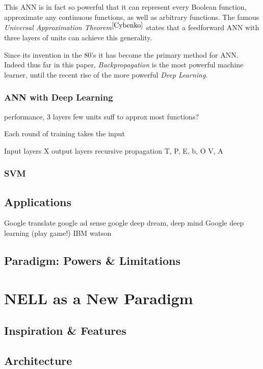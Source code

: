 \documentclass[12pt]{article}  %
\begin{document}
This ANN is in fact so powerful that it can represent every Boolean function, approximate any continuous functions, as well as arbitrary functions. The famous {\em Universal Approximation Theorem}$^{\ref{Cybenko}}$ states that a feedforward ANN with three layers of units can achieve this generality.

Since its invention in the 80's it has become the primary method for ANN. Indeed thus far in this paper, {\em Backpropagation} is the most powerful machine learner, until the recent rise of the more powerful {\em Deep Learning.}



\subsubsection{ANN with Deep Learning}







performance, 3 layers few units suff to approx most functions?

Each round of training takes the input 


Input layers X
output layers
recursive propagation
T, P, E, b, O
V, A


\subsubsection{SVM}

\subsection{Applications}
Google translate
google ad sense
google deep dream, deep mind
Google deep learning (play game!)
IBM watson


\subsection{Paradigm: Powers \& Limitations}



\section{NELL as a New Paradigm}

\subsection{Inspiration \& Features}
\subsection{Architecture}
\end{document}
